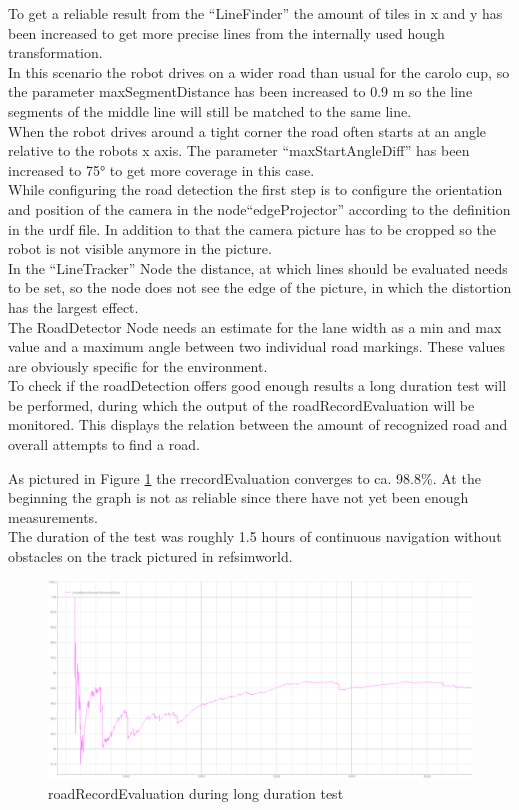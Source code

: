 To get a reliable result from the ``LineFinder'' the amount of tiles in x and y has been increased to get more precise lines from the internally used hough transformation.\\
In this scenario the robot drives on a wider road than usual for the carolo cup, so the parameter maxSegmentDistance has been increased to 0.9 m so the line segments of the middle line will still be matched to the same line.\\
When the robot drives around a tight corner the road often starts at an angle relative to the robots x axis. The parameter ``maxStartAngleDiff'' has been increased to 75° to get more coverage in this case.\\

While configuring the road detection the first step is to configure the orientation and position of the camera in the node``edgeProjector'' according to the definition in the urdf file. In addition to that the camera picture has to be cropped so the robot is not visible anymore in the picture.\\

In the ``LineTracker'' Node the distance, at which lines should be evaluated needs to be set, so the node does not see the edge of the picture, in which the distortion has the largest effect.\\


The RoadDetector Node needs an estimate for the lane width as a min and max value and a maximum angle between two individual road markings. These values are obviously specific for the environment.\\

To check if the roadDetection offers good enough results a long duration test will be performed, during which the output of the roadRecordEvaluation will be monitored. This displays the relation between the amount of recognized road and overall attempts to find a road.

As pictured in Figure \ref{longdurroad} the rrecordEvaluation converges to ca. 98.8\%. At the beginning the graph is not as reliable since there have not yet been enough measurements.\\
The duration of the test was roughly 1.5 hours of continuous navigation without obstacles on the track pictured in ref{simworld}.

\begin{figure}[H]
	\includegraphics[width=\textwidth]{Pictures/long duration road detection test}
	\caption{roadRecordEvaluation during long duration test}
	\label{longdurroad}
\end{figure}



